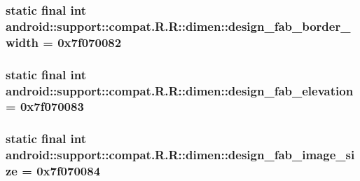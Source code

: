 \hypertarget{classandroid_1_1support_1_1compat_1_1_r_1_1dimen_3854b0d60e28d9aefaf113666b1fc4a8}{
\subsubsection[{design\_\-fab\_\-border\_\-width}]{\setlength{\rightskip}{0pt plus 5cm}static final int android::support::compat.R.R::dimen::design\_\-fab\_\-border\_\-width = 0x7f070082}}
\label{classandroid_1_1support_1_1compat_1_1_r_1_1dimen_3854b0d60e28d9aefaf113666b1fc4a8}


\hypertarget{classandroid_1_1support_1_1compat_1_1_r_1_1dimen_bd58d5b982e81a84f727a245b6c0cc08}{
\subsubsection[{design\_\-fab\_\-elevation}]{\setlength{\rightskip}{0pt plus 5cm}static final int android::support::compat.R.R::dimen::design\_\-fab\_\-elevation = 0x7f070083}}
\label{classandroid_1_1support_1_1compat_1_1_r_1_1dimen_bd58d5b982e81a84f727a245b6c0cc08}


\hypertarget{classandroid_1_1support_1_1compat_1_1_r_1_1dimen_122efacabcccf7cf9f02d2b8ea8a0cfa}{
\subsubsection[{design\_\-fab\_\-image\_\-size}]{\setlength{\rightskip}{0pt plus 5cm}static final int android::support::compat.R.R::dimen::design\_\-fab\_\-image\_\-size = 0x7f070084}}
\label{classandroid_1_1support_1_1compat_1_1_r_1_1dimen_122efacabcccf7cf9f02d2b8ea8a0cfa}


